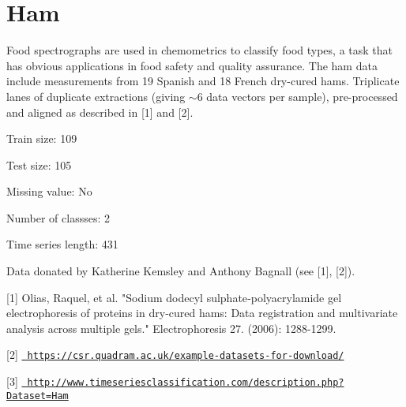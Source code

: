 \chapter{Ham}
\hypertarget{md_external_2data_2UCRArchive__2018_2Ham_2README}{}\label{md_external_2data_2UCRArchive__2018_2Ham_2README}
\label{md_external_2data_2UCRArchive__2018_2Ham_2README_autotoc_md116}%
%
 Food spectrographs are used in chemometrics to classify food types, a task that has obvious applications in food safety and quality assurance. The ham data include measurements from 19 Spanish and 18 French dry-\/cured hams. Triplicate lanes of duplicate extractions (giving \texorpdfstring{$\sim$}{\string~}6 data vectors per sample), pre-\/processed and aligned as described in \mbox{[}1\mbox{]} and \mbox{[}2\mbox{]}.

Train size\+: 109

Test size\+: 105

Missing value\+: No

Number of classses\+: 2

Time series length\+: 431

Data donated by Katherine Kemsley and Anthony Bagnall (see \mbox{[}1\mbox{]}, \mbox{[}2\mbox{]}).

\mbox{[}1\mbox{]} Olias, Raquel, et al. "{}\+Sodium dodecyl sulphate‐polyacrylamide gel electrophoresis of proteins in dry‐cured hams\+: Data registration and multivariate analysis across multiple gels."{} Electrophoresis 27. (2006)\+: 1288-\/1299.

\mbox{[}2\mbox{]} \href{https://csr.quadram.ac.uk/example-datasets-for-download/}{\texttt{ https\+://csr.\+quadram.\+ac.\+uk/example-\/datasets-\/for-\/download/}}

\mbox{[}3\mbox{]} \href{http://www.timeseriesclassification.com/description.php?Dataset=Ham}{\texttt{ http\+://www.\+timeseriesclassification.\+com/description.\+php?\+Dataset=\+Ham}} 
